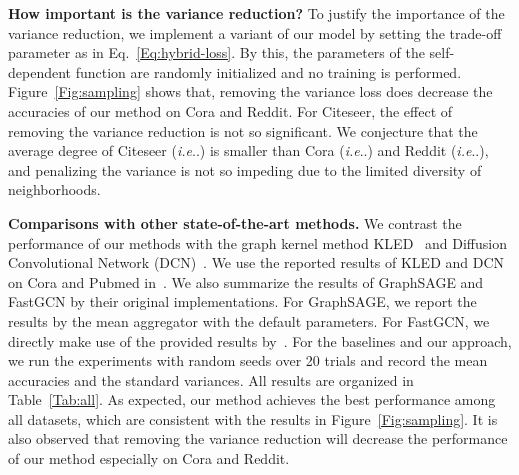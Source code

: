 \documentclass{article}
\makeatletter
\DeclareRobustCommand\onedot{\futurelet\@let@token\@onedot}
\def\@onedot{\ifx\@let@token.\else.\null\fi\xspace}
\def\ie{\emph{i.e}\onedot} \def\Ie{\emph{I.e}\onedot}
\makeatother
\begin{document}
\textbf{How important is the variance reduction?}
To justify the importance of the variance reduction, we implement a variant of our model by setting the trade-off parameter as  in Eq.~\eqref{Eq:hybrid-loss}. By this, the parameters of the self-dependent function are randomly initialized and no training is performed. Figure~\ref{Fig:sampling} shows that, removing the variance loss does decrease the accuracies of our method on Cora and Reddit. For Citeseer, the effect of removing the variance reduction is not so significant. We conjecture that the average degree of Citeseer (\ie 1.4) is smaller than Cora (\ie 2.0) and Reddit (\ie 492), and penalizing the variance is not so impeding due to the limited diversity of neighborhoods.

\textbf{Comparisons with other state-of-the-art methods.}
We contrast the performance of our methods with the graph kernel method KLED~\cite{Fouss06anexperimental} and Diffusion Convolutional Network (DCN)~\cite{atwood2016diffusion}. We use the reported results of KLED and DCN on Cora and Pubmed in~\cite{atwood2016diffusion}.  We also summarize the results of GraphSAGE and FastGCN by their original implementations. For GraphSAGE, we report the results by the mean aggregator with the default parameters. For FastGCN, we directly make use of the provided results by~\cite{chen2018fastgcn}. For the baselines and our approach, we run the experiments with random seeds over 20 trials and record the mean accuracies and the standard variances. All results are organized in Table~\ref{Tab:all}. As expected, our method achieves the best performance among all datasets, which are consistent with the results in Figure~\ref{Fig:sampling}. It is also observed that removing the variance reduction will decrease the performance of our method especially on Cora and Reddit.
\end{document}
